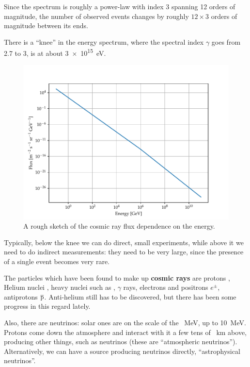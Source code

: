 \documentclass[main.tex]{subfiles}
\begin{document}
Since the spectrum is roughly a power-law with index 3 spanning 12 orders of magnitude,
the number of observed events changes by roughly \(12 \times 3\) orders of magnitude between its ends. 

There is a ``knee'' in the energy spectrum, where the spectral index \(\gamma\) goes from 2.7 to 3, is at about \SI{3e15}{eV}. 

\begin{figure}[ht]
\centering
\includegraphics[width=\textwidth]{figures/cosmic_rays_energies}
\caption{A rough sketch of the cosmic ray flux dependence on the energy.}
\label{fig:cosmic_rays_energies}
\end{figure}

Typically, below the knee we can do direct, small experiments, while above it we need to do indirect measurements: they need to be very large, since the presence of a single event becomes very rare.

The particles which have been found to make up \textbf{cosmic rays} are protons , Helium nuclei , heavy nuclei such as , \(\gamma \) rays, electrons and positrons \(e^{\pm}\), antiprotons \(\ce{\overline{p}}\). 
Anti-helium still has to be discovered, but there has been some progress in this regard lately. 

Also, there are neutrinos: solar ones are on the scale of the \SI{}{MeV}, up to \SI{10}{MeV}. 
Protons come down the atmosphere and interact with it a few tens of \SI{}{km} above, producing other things, such as neutrinos (these are ``atmospheric neutrinos'').
Alternatively, we can have a source producing neutrinos directly, ``astrophysical neutrinos''. 
\end{document}
